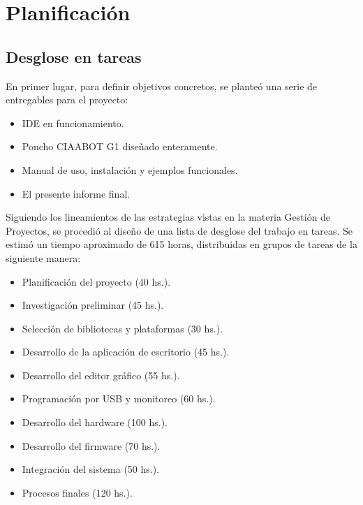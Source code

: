\section{Planificación}
\label{sec:planificacion}
\subsection{Desglose en tareas}
En primer lugar, para definir objetivos concretos, se planteó una serie de entregables para el proyecto:

\begin{itemize}
\item IDE en funcionamiento.
\item Poncho CIAABOT G1 diseñado enteramente.
\item Manual de uso, instalación y ejemplos funcionales.
\item El presente informe final.
\end{itemize}

Siguiendo los lineamientos de las estrategias vistas en la materia Gestión de Proyectos, se procedió al diseño de una lista de desglose del trabajo en tareas. Se estimó un tiempo aproximado de 615 horas, distribuidas en grupos de tareas de la siguiente manera:

\begin{itemize}
\item Planificación del proyecto (40 hs.).
\item Investigación preliminar (45 hs.).
\item Selección de bibliotecas y plataformas (30 hs.).
\item Desarrollo de la aplicación de escritorio (45 hs.).
\item Desarrollo del editor gráfico (55 hs.).
\item Programación por USB y monitoreo (60 hs.).
\item Desarrollo del hardware (100 hs.).
\item Desarrollo del firmware (70 hs.).
\item Integración del sistema (50 hs.).
\item Procesos finales (120 hs.).
\end{itemize}
